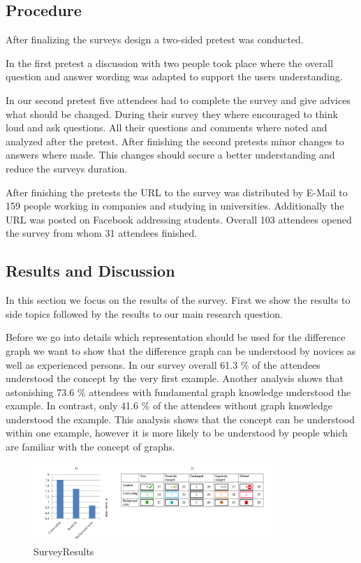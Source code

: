 \documentclass{llncs}
\begin{document}
\subsection{Procedure} %
\label{sec:Procedure}
After finalizing the surveys design a two-sided pretest was conducted.

In the first pretest a discussion with two people took place where the overall question and answer wording was adapted to support the users understanding.

In our second pretest five attendees had to complete the survey and give advices what should be changed. During their survey they where encouraged to think loud and ask questions. All their questions and comments where noted and analyzed after the pretest. After finishing the second pretests minor changes to answers where made. This changes should secure a better understanding and reduce the surveys duration.

After finishing the pretests the URL to the survey was distributed by E-Mail to 159 people working in companies and studying in universities. Additionally the URL was posted on Facebook addressing students. Overall 103 attendees opened the survey from whom 31 attendees finished.


\subsection{Results and Discussion} %
\label{sec:Results}
In this section we focus on the results of the survey. First we show the results to side topics followed by the results to our main research question.

Before we go into details which representation should be used for the difference graph we want to show that the difference graph can be understood by novices as well as experienced persons. In our survey overall 61.3 \% of the attendees understood the concept by the very first example. Another analysis shows that astonishing 73.6 \% attendees with fundamental graph knowledge understood the example. In contrast, only 41.6 \% of the attendees without graph knowledge understood the example. This analysis shows that the concept can be understood within one example, however it is more likely to be understood by people which are familiar with the concept of graphs.

\begin{figure}
	\centering
	\includegraphics[width=350px]{Images/Results.PNG}
	\caption{SurveyResults}
	\label{fig:SurveyResults}
\end{figure}
\end{document}
